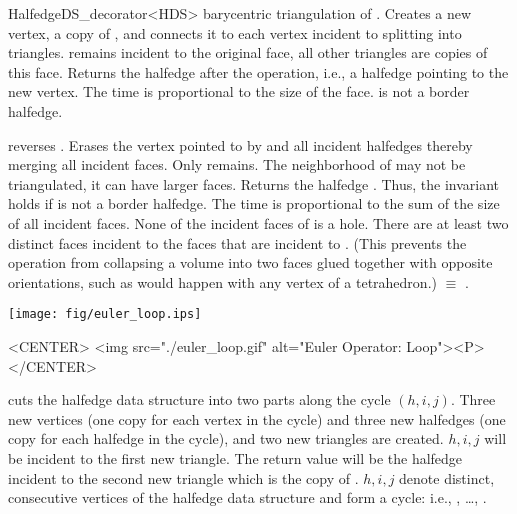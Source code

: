 \begin{ccRefClass}{HalfedgeDS_decorator<HDS>}
    {barycentric triangulation of . Creates a new vertex,
     a copy of , and connects it to each vertex incident 
     to  splitting  into triangles. 
      remains incident to the original face, all other triangles 
     are copies of this face. Returns the halfedge 
     after the operation, i.e., a halfedge pointing to the new vertex. 
     The time is proportional to the size of the face.
     \ccPrecond {} is not a border halfedge.}

    {reverses . Erases the
     vertex pointed to by  and all incident halfedges thereby
     merging all incident faces. Only  remains. 
     The neighborhood of  may not be triangulated,
     it can have larger faces. Returns the halfedge .
     Thus, the invariant  holds if  is not a border halfedge.
     The time is proportional to the sum of the size of all incident faces.
     \ccPrecond None of the incident faces of  is 
     a hole. There are at least two distinct faces incident
     to the faces that are incident to . (This 
     prevents the operation from collapsing a volume into two faces
     glued together with opposite orientations, such as would
     happen with any vertex of a tetrahedron.)
       $\equiv$ 
     .}

\newpage

\begin{ccTexOnly}
    \begin{center}
      \parbox{0.636\textwidth}{%
          \texttt{[image: fig/euler\_loop.ips]}%
      }
    \end{center}
\end{ccTexOnly}

\begin{ccHtmlOnly}
    <CENTER>
    <img src="./euler_loop.gif" alt="Euler Operator: Loop"><P>
    </CENTER>
\end{ccHtmlOnly}

   {cuts the halfedge data structure into two parts along the cycle $(h,i,j)$.
    Three new vertices (one copy for each vertex in the cycle) and three 
    new halfedges (one copy for each halfedge in the cycle), and two new 
    triangles are created. $h,i,j$ will be incident to the first new triangle.
    The return value will be the halfedge incident to the second new triangle 
    which is the copy of .
    \ccPrecond $h,i,j$ denote distinct, consecutive vertices of the
    halfedge data structure and form a cycle: i.e., , \ldots, .}


\end{ccRefClass}
